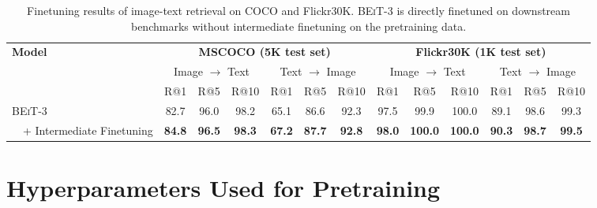\documentclass{article}
\newcommand\our{\textsc{BEiT-3}}
\begin{document}
\begin{table}[h]
\centering
\small
\begin{tabular}{@{}l@{\hskip1pt} @{\hskip1pt}c@{ \hskip1pt} @{\hskip1pt}c@{ \hskip1pt} @{\hskip1pt}c@{ \hskip1pt} @{\hskip1pt}c@{ \hskip1pt} @{\hskip1pt}c@{ \hskip1pt} @{\hskip1pt}c@{ \hskip1pt} | @{ \hskip2pt}c@{ \hskip1pt} @{\hskip1pt}c@{ \hskip1pt} @{\hskip1pt}c@{ \hskip1pt} @{\hskip1pt}c@{ \hskip1pt} @{\hskip1pt}c@{ \hskip1pt} @{\hskip1pt}c@{} }
\toprule
\multirow{3}{*}{\bf Model} & \multicolumn{6}{c}{\bf MSCOCO (5K test set)} & \multicolumn{6}{c}{\bf Flickr30K (1K test set)} \\
 & \multicolumn{3}{c}{Image $\rightarrow$ Text} & \multicolumn{3}{c}{Text $\rightarrow$ Image} & \multicolumn{3}{c}{Image $\rightarrow$ Text} & \multicolumn{3}{c}{Text $\rightarrow$ Image} \\
 \cmidrule(lr){2-4} \cmidrule(lr){5-7} \cmidrule(lr){8-10} \cmidrule(lr){11-13}
 & R@1 & R@5 & R@10 & R@1 & R@5 & R@10 & R@1 & R@5 & R@10 & R@1 & R@5 & R@10 \\
\midrule
\our{} & 82.7 & 96.0 & 98.2 & 65.1 & 86.6 & 92.3 & 97.5 & 99.9 & 100.0 & 89.1 & 98.6 & 99.3 \\
~~+ Intermediate Finetuning & \bf 84.8 & \bf 96.5 & \bf 98.3 & \bf 67.2 & \bf 87.7 & \bf 92.8 & \bf 98.0 & \bf 100.0 & \bf 100.0 & \bf 90.3 & \bf 98.7 & \bf 99.5 \\
\bottomrule
\end{tabular}
\caption{Finetuning results of image-text retrieval on COCO and Flickr30K.
\our{} is directly finetuned on downstream benchmarks without intermediate finetuning on the pretraining data.
}
\label{tbl:results:finetuned_retrieval_woitcct}
\end{table}


\section{Hyperparameters Used for Pretraining}
\end{document}
